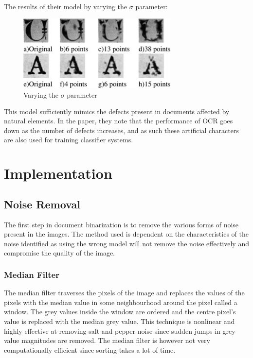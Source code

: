 \documentclass[a4paper, 12pt]{report}
\begin{document}
The results of their model by varying the \(\sigma\) parameter:

\begin{figure}[ht]
    \centering
    \includegraphics[width=8cm]{char_degradation.jpg}
    \caption{Varying the \(\sigma\) parameter~\cite{kieu2012character}}
    \label{fig:char_degradation}
\end{figure}

This model sufficiently mimics the defects present in documents affected by
natural elements. In the paper, they note that the performance of OCR goes down
as the number of defects increases, and as such these artificial characters are
also used for training classifier systems.

\section{Implementation}

\subsection{Noise Removal}
The first step in document binarization is to remove the various forms of noise
present in the images. The method used is dependent on the characteristics of
the noise identified as using the wrong model will not remove the noise
effectively and compromise the quality of the image.

\subsubsection{Median Filter}
The median filter traverses the pixels of the image and replaces the values of
the pixels with the median value in some neighbourhood around the pixel called
a window. The grey values inside the window are ordered and the centre pixel’s
value is replaced with the median grey value. This technique is nonlinear and
highly effective at removing salt-and-pepper noise since sudden jumps in grey
value magnitudes are removed. The median filter is however not very
computationally efficient since sorting takes a lot of time.
\end{document}
